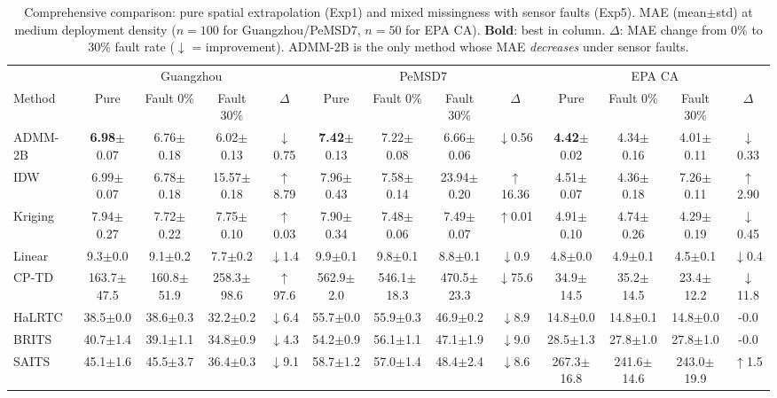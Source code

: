 \begin{table}[htbp]
  \centering
  \caption{Comprehensive comparison: pure spatial extrapolation (Exp1) and mixed missingness with sensor faults (Exp5). MAE (mean$\pm$std) at medium deployment density ($n{=}100$ for Guangzhou/PeMSD7, $n{=}50$ for EPA CA). \textbf{Bold}: best in column. $\Delta$: MAE change from 0\% to 30\% fault rate ($\downarrow$ = improvement). ADMM-2B is the only method whose MAE \emph{decreases} under sensor faults.}
  \label{tab:main_results}
  \small
  \setlength{\tabcolsep}{3pt}
  \begin{tabular}{lcccccccccccc}
    \toprule
    & \multicolumn{4}{c}{Guangzhou} & \multicolumn{4}{c}{PeMSD7} & \multicolumn{4}{c}{EPA CA} \\
    \cmidrule(lr){2-5} \cmidrule(lr){6-9} \cmidrule(lr){10-13}
    Method & Pure & Fault 0\% & Fault 30\% & $\Delta$ & Pure & Fault 0\% & Fault 30\% & $\Delta$ & Pure & Fault 0\% & Fault 30\% & $\Delta$ \\
    \midrule
    ADMM-2B & \textbf{6.98}$\pm$0.07 & 6.76$\pm$0.18 & 6.02$\pm$0.13 & $\downarrow$0.75 & \textbf{7.42}$\pm$0.13 & 7.22$\pm$0.08 & 6.66$\pm$0.06 & $\downarrow$0.56 & \textbf{4.42}$\pm$0.02 & 4.34$\pm$0.16 & 4.01$\pm$0.11 & $\downarrow$0.33 \\
    IDW & 6.99$\pm$0.07 & 6.78$\pm$0.18 & 15.57$\pm$0.18 & $\uparrow$8.79 & 7.96$\pm$0.43 & 7.58$\pm$0.14 & 23.94$\pm$0.20 & $\uparrow$16.36 & 4.51$\pm$0.07 & 4.36$\pm$0.18 & 7.26$\pm$0.11 & $\uparrow$2.90 \\
    Kriging & 7.94$\pm$0.27 & 7.72$\pm$0.22 & 7.75$\pm$0.10 & $\uparrow$0.03 & 7.90$\pm$0.34 & 7.48$\pm$0.06 & 7.49$\pm$0.07 & $\uparrow$0.01 & 4.91$\pm$0.10 & 4.74$\pm$0.26 & 4.29$\pm$0.19 & $\downarrow$0.45 \\
    \midrule
    Linear & 9.3$\pm$0.0 & 9.1$\pm$0.2 & 7.7$\pm$0.2 & $\downarrow$1.4 & 9.9$\pm$0.1 & 9.8$\pm$0.1 & 8.8$\pm$0.1 & $\downarrow$0.9 & 4.8$\pm$0.0 & 4.9$\pm$0.1 & 4.5$\pm$0.1 & $\downarrow$0.4 \\
    CP-TD & 163.7$\pm$47.5 & 160.8$\pm$51.9 & 258.3$\pm$98.6 & $\uparrow$97.6 & 562.9$\pm$2.0 & 546.1$\pm$18.3 & 470.5$\pm$23.3 & $\downarrow$75.6 & 34.9$\pm$14.5 & 35.2$\pm$14.5 & 23.4$\pm$12.2 & $\downarrow$11.8 \\
    HaLRTC & 38.5$\pm$0.0 & 38.6$\pm$0.3 & 32.2$\pm$0.2 & $\downarrow$6.4 & 55.7$\pm$0.0 & 55.9$\pm$0.3 & 46.9$\pm$0.2 & $\downarrow$8.9 & 14.8$\pm$0.0 & 14.8$\pm$0.1 & 14.8$\pm$0.0 & -0.0 \\
    BRITS & 40.7$\pm$1.4 & 39.1$\pm$1.1 & 34.8$\pm$0.9 & $\downarrow$4.3 & 54.2$\pm$0.9 & 56.1$\pm$1.1 & 47.1$\pm$1.9 & $\downarrow$9.0 & 28.5$\pm$1.3 & 27.8$\pm$1.0 & 27.8$\pm$1.0 & -0.0 \\
    SAITS & 45.1$\pm$1.6 & 45.5$\pm$3.7 & 36.4$\pm$0.3 & $\downarrow$9.1 & 58.7$\pm$1.2 & 57.0$\pm$1.4 & 48.4$\pm$2.4 & $\downarrow$8.6 & 267.3$\pm$16.8 & 241.6$\pm$14.6 & 243.0$\pm$19.9 & $\uparrow$1.5 \\
    \bottomrule
  \end{tabular}
\end{table}